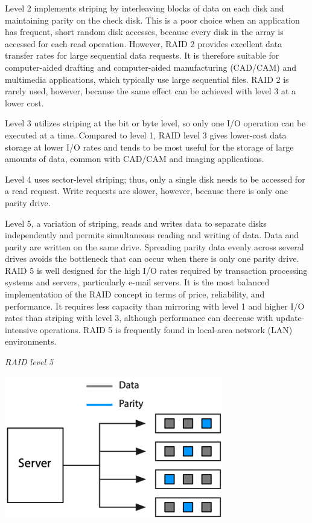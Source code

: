 \documentclass[
]{article}
\begin{document}
Level 2 implements striping by interleaving blocks of data on each disk
and maintaining parity on the check disk. This is a poor choice when an
application has frequent, short random disk accesses, because every disk
in the array is accessed for each read operation. However, RAID 2
provides excellent data transfer rates for large sequential data
requests. It is therefore suitable for computer-aided drafting and
computer-aided manufacturing (CAD/CAM) and multimedia applications,
which typically use large sequential files. RAID 2 is rarely used,
however, because the same effect can be achieved with level 3 at a lower
cost.

Level 3 utilizes striping at the bit or byte level, so only one I/O
operation can be executed at a time. Compared to level 1, RAID level 3
gives lower-cost data storage at lower I/O rates and tends to be most
useful for the storage of large amounts of data, common with CAD/CAM and
imaging applications.

Level 4 uses sector-level striping; thus, only a single disk needs to be
accessed for a read request. Write requests are slower, however, because
there is only one parity drive.

Level 5, a variation of striping, reads and writes data to separate
disks independently and permits simultaneous reading and writing of
data. Data and parity are written on the same drive. Spreading parity
data evenly across several drives avoids the bottleneck that can occur
when there is only one parity drive. RAID 5 is well designed for the
high I/O rates required by transaction processing systems and servers,
particularly e-mail servers. It is the most balanced implementation of
the RAID concept in terms of price, reliability, and performance. It
requires less capacity than mirroring with level 1 and higher I/O rates
than striping with level 3, although performance can decrease with
update-intensive operations. RAID 5 is frequently found in local-area
network (LAN) environments.

\emph{RAID level 5}

\includegraphics{Figures/Chapter 20/raid-5.png}
\end{document}
